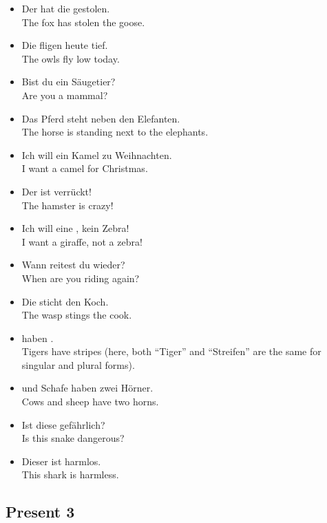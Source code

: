 \begin{itemize}
  \item  Der  hat die  gestolen. \\
  The fox has stolen the goose.
  \item  Die  fligen heute tief. \\
  The owls fly low today.
  \item  Bist du ein S{\"a}ugetier? \\
  Are you a mammal?
  \item  Das Pferd steht neben den Elefanten. \\
  The horse is standing next to the elephants.
  \item  Ich will ein Kamel zu Weihnachten. \\
  I want a camel for Christmas.
  \item  Der  ist verr{\"u}ckt! \\
  The hamster is crazy!
  \item  Ich will eine , kein Zebra! \\
  I want a giraffe, not a zebra!
  \item  Wann reitest du wieder? \\
  When are you riding again?
  \item  Die  sticht den Koch. \\
  The wasp stings the cook.
  \item  {} haben . \\
  Tigers have stripes (here, both ``Tiger'' and ``Streifen'' are the same for singular and plural forms).
  \item  {} und Schafe haben zwei H{\"o}rner. \\
  Cows and sheep have two horns.
  \item  Ist diese  gef{\"a}hrlich? \\
  Is this snake dangerous?
  \item  Dieser  ist harmlos. \\
  This shark is harmless.
\end{itemize}


\pagebreak
\subsection{Present 3}

